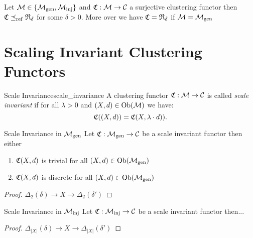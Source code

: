 \begin{corollary}{}{}
\newresult
Let $\mathcal{M} \in \{{\mathcal{M}_\mathrm{gen}}, {\mathcal{M}_\mathrm{inj}}\}$ and $\mathfrak{C}: \mathcal{M} \to \mathcal{C}$ a surjective clustering functor then $\mathfrak{C} \preceq_\mathrm{ref} \mathfrak{R}_\delta$ for some $\delta > 0$. More over we have $\mathfrak{C} = \mathfrak{R}_\delta$ if $\mathcal{M} = {\mathcal{M}_\mathrm{gen}}$
\end{corollary}

\section{Scaling Invariant Clustering Functors}

\begin{definition}{Scale Invariance}{scale_invariance}
A clustering functor $\mathfrak{C}: \mathcal{M} \to \mathcal{C}$ is called \emph{scale invariant} if for all $\lambda > 0$ and $(X,d) \in \mathrm {Ob}(\mathcal{M})$ we have:
\begin{equation*}
    \mathfrak{C}((X,d)) = \mathfrak{C}(X,\lambda \cdot d)).
\end{equation*}
\end{definition}

\begin{proposition}{Scale Invariance in ${\mathcal{M}_\mathrm{gen}}$}{}
Let $\mathfrak{C}: {\mathcal{M}_\mathrm{gen}} \to \mathcal{C}$ be a scale invariant functor then either
\begin{enumerate}
    \item $\mathfrak{C}(X,d)$ is trivial for all $(X,d) \in \mathrm {Ob}({\mathcal{M}_\mathrm{gen}})$
    \item $\mathfrak{C}(X,d)$ is discrete for all $(X,d) \in \mathrm {Ob}({\mathcal{M}_\mathrm{gen}})$
\end{enumerate}
\end{proposition}

\begin{proof}
$\Delta_2(\delta) \to X \to \Delta_2(\delta')$
\end{proof}

\begin{proposition}{Scale Invariance in ${\mathcal{M}_\mathrm{inj}}$}{}
Let $\mathfrak{C}: {\mathcal{M}_\mathrm{inj}} \to \mathcal{C}$ be a scale invariant functor then...
\end{proposition}

\begin{proof}
$\Delta_{|X|}(\delta) \to X \to \Delta_{|X|}(\delta')$
\end{proof}